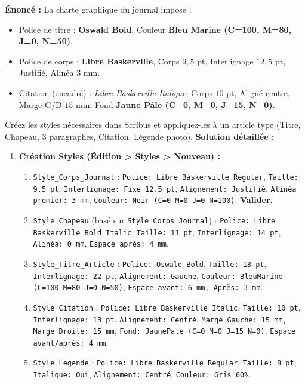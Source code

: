 \documentclass[11pt]{article}
\begin{document}
\begin{exoresolu}
    \textbf{Énoncé :} La charte graphique du journal impose :
    \begin{itemize}
        \item Police de titre : \textbf{Oswald Bold}, Couleur \textbf{Bleu Marine (C=100, M=80, J=0, N=50)}.
        \item Police de corps : \textbf{Libre Baskerville}, Corps $9,5$ pt, Interlignage $12,5$ pt, Justifié, Alinéa $3$ mm.
        \item Citation (encadré) : \textit{Libre Baskerville Italique}, Corps $10$ pt, Aligné centre, Marge G/D $15$ mm, Fond \textbf{Jaune Pâle (C=0, M=0, J=15, N=0)}.
    \end{itemize}
    Créez les styles nécessaires dans Scribus et appliquez-les à un article type (Titre, Chapeau, 3 paragraphes, Citation, Légende photo).
    \tcblower
    \textbf{Solution détaillée :}
    \begin{enumerate}
        \item \textbf{Création Styles (Édition > Styles > Nouveau) :}
              \begin{enumerate}
                  \item \texttt{Style\_Corps\_Journal} : \texttt{Police: Libre Baskerville Regular}, \texttt{Taille: 9.5 pt}, \texttt{Interlignage: Fixe 12.5 pt}, \texttt{Alignement: Justifié}, \texttt{Alinéa premier: 3 mm}, \texttt{Couleur: Noir (C=0 M=0 J=0 N=100)}. \textbf{Valider}.
                  \item \texttt{Style\_Chapeau} (basé sur \texttt{Style\_Corps\_Journal}) : \texttt{Police: Libre Baskerville Bold Italic}, \texttt{Taille: 11 pt}, \texttt{Interlignage: 14 pt}, \texttt{Alinéa: 0 mm}, \texttt{Espace après: 4 mm}.
                  \item \texttt{Style\_Titre\_Article} : \texttt{Police: Oswald Bold}, \texttt{Taille: 18 pt}, \texttt{Interlignage: 22 pt}, \texttt{Alignement: Gauche}, \texttt{Couleur: BleuMarine (C=100 M=80 J=0 N=50)}, \texttt{Espace avant: 6 mm, Après: 3 mm}.
                  \item \texttt{Style\_Citation} : \texttt{Police: Libre Baskerville Italic}, \texttt{Taille: 10 pt}, \texttt{Interlignage: 13 pt}, \texttt{Alignement: Centré}, \texttt{Marge Gauche: 15 mm, Marge Droite: 15 mm}, \texttt{Fond: JaunePale (C=0 M=0 J=15 N=0)}, \texttt{Espace avant/après: 4 mm}.
                  \item \texttt{Style\_Legende} : \texttt{Police: Libre Baskerville Regular}, \texttt{Taille: 8 pt}, \texttt{Italique: Oui}, \texttt{Alignement: Centré}, \texttt{Couleur: Gris 60\%}.

\end{enumerate}
\end{enumerate}
\end{exoresolu}
\end{document}
